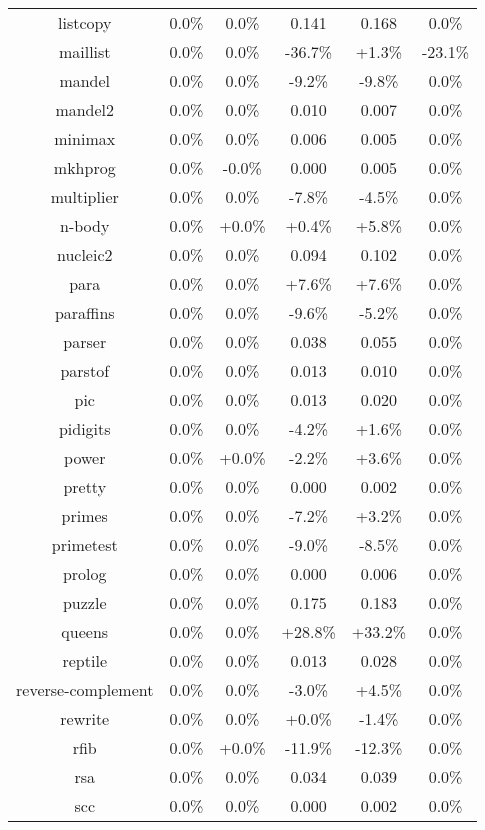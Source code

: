 \begin{tabular}{ c c c c c c }
listcopy &  0.0\% &  0.0\% & 0.141 & 0.168 &  0.0\%\\
maillist &  0.0\% &  0.0\% & -36.7\% & +1.3\% & -23.1\%\\
mandel &  0.0\% &  0.0\% & -9.2\% & -9.8\% &  0.0\%\\
mandel2 &  0.0\% &  0.0\% & 0.010 & 0.007 &  0.0\%\\
minimax &  0.0\% &  0.0\% & 0.006 & 0.005 &  0.0\%\\
mkhprog &  0.0\% & -0.0\% & 0.000 & 0.005 &  0.0\%\\
multiplier &  0.0\% &  0.0\% & -7.8\% & -4.5\% &  0.0\%\\
n-body &  0.0\% & +0.0\% & +0.4\% & +5.8\% &  0.0\%\\
nucleic2 &  0.0\% &  0.0\% & 0.094 & 0.102 &  0.0\%\\
para &  0.0\% &  0.0\% & +7.6\% & +7.6\% &  0.0\%\\
paraffins &  0.0\% &  0.0\% & -9.6\% & -5.2\% &  0.0\%\\
parser &  0.0\% &  0.0\% & 0.038 & 0.055 &  0.0\%\\
parstof &  0.0\% &  0.0\% & 0.013 & 0.010 &  0.0\%\\
pic &  0.0\% &  0.0\% & 0.013 & 0.020 &  0.0\%\\
pidigits &  0.0\% &  0.0\% & -4.2\% & +1.6\% &  0.0\%\\
power &  0.0\% & +0.0\% & -2.2\% & +3.6\% &  0.0\%\\
pretty &  0.0\% &  0.0\% & 0.000 & 0.002 &  0.0\%\\
primes &  0.0\% &  0.0\% & -7.2\% & +3.2\% &  0.0\%\\
primetest &  0.0\% &  0.0\% & -9.0\% & -8.5\% &  0.0\%\\
prolog &  0.0\% &  0.0\% & 0.000 & 0.006 &  0.0\%\\
puzzle &  0.0\% &  0.0\% & 0.175 & 0.183 &  0.0\%\\
queens &  0.0\% &  0.0\% & +28.8\% & +33.2\% &  0.0\%\\
reptile &  0.0\% &  0.0\% & 0.013 & 0.028 &  0.0\%\\
reverse-complement &  0.0\% &  0.0\% & -3.0\% & +4.5\% &  0.0\%\\
rewrite &  0.0\% &  0.0\% & +0.0\% & -1.4\% &  0.0\%\\
rfib &  0.0\% & +0.0\% & -11.9\% & -12.3\% &  0.0\%\\
rsa &  0.0\% &  0.0\% & 0.034 & 0.039 &  0.0\%\\
scc &  0.0\% &  0.0\% & 0.000 & 0.002 &  0.0\%\\

\end{tabular}
